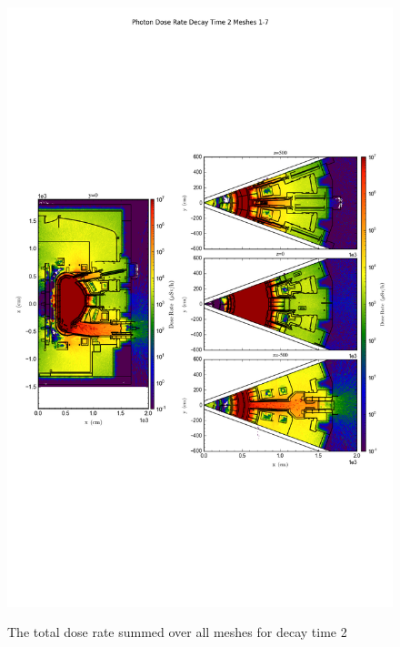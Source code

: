 \documentclass[12pt]{article}
\begin{document}
\begin{figure}[ht!]
\centering
\includegraphics[trim={0cm 9cm 0cm 10cm},clip,scale=0.75]{../plots/final_model/Photon_Dose_Rate_Decay_Time_2_Meshes_1-7.png}
\label{fig:photons_dc2_b4c_total}
\caption{The total dose rate summed over all meshes for decay time 2}
\end{figure}
\end{document}
